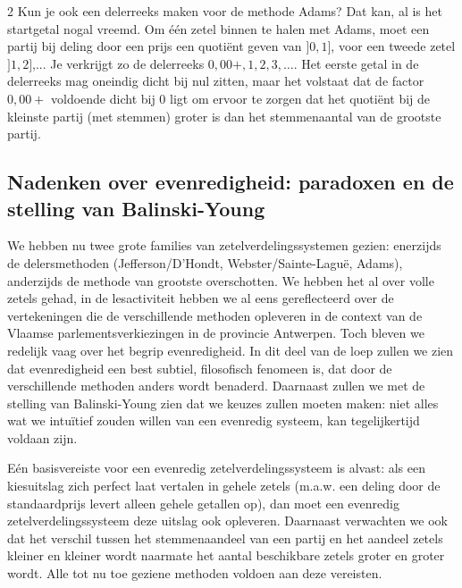 \begin{multicols}{2}
Kun je ook een delerreeks maken voor de methode Adams? Dat kan, al is het startgetal nogal vreemd. Om één zetel binnen te halen met Adams, moet een partij bij deling door een prijs een quotiënt geven van $]0,1]$, voor een tweede zetel $]1,2]$,... Je verkrijgt zo de delerreeks $0,00+, 1, 2, 3,\ldots$. Het eerste getal in de delerreeks mag oneindig dicht bij nul zitten, maar het volstaat dat de factor $0,00+$ voldoende dicht bij 0 ligt om ervoor te zorgen dat het quotiënt bij de kleinste partij (met stemmen) groter is dan het stemmenaantal van de grootste partij.


\subsection{Nadenken over evenredigheid: paradoxen en de stelling van Balinski-Young}
We hebben nu twee grote families van zetelverdelingssystemen gezien: enerzijds de delersmethoden (Jefferson/D'Hondt, Webster/Sainte-Laguë, Adams), anderzijds de methode van grootste overschotten. We hebben het al over volle zetels gehad, in de lesactiviteit hebben we al eens gereflecteerd over de vertekeningen die de verschillende methoden opleveren in de context van de Vlaamse parlementsverkiezingen in de provincie Antwerpen. Toch bleven we redelijk vaag over het begrip evenredigheid. In dit deel van de loep zullen we zien dat evenredigheid een best subtiel, filosofisch fenomeen is, dat door de verschillende methoden anders wordt benaderd. Daarnaast zullen we met de stelling van Balinski-Young zien dat we keuzes zullen moeten maken: niet alles wat we intuïtief zouden willen van een evenredig systeem, kan tegelijkertijd voldaan zijn.

Eén basisvereiste voor een evenredig zetelverdelingssysteem is alvast: als een kiesuitslag zich perfect laat vertalen in gehele zetels (m.a.w. een deling door de standaardprijs levert alleen gehele getallen op), dan moet een evenredig zetelverdelingssysteem deze uitslag ook opleveren. Daarnaast verwachten we ook dat het verschil tussen het stemmenaandeel van een partij en het aandeel zetels kleiner en kleiner wordt naarmate het aantal beschikbare zetels groter en groter wordt. Alle tot nu toe geziene methoden voldoen aan deze vereisten.


\end{multicols}
